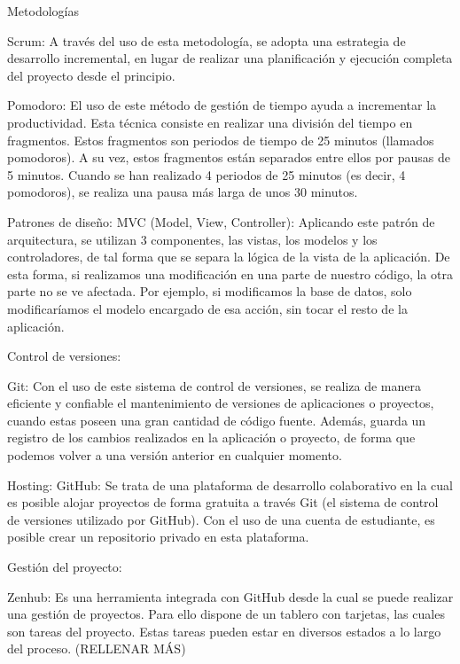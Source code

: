 
Metodologías

Scrum: A través del uso de esta metodología, se adopta una estrategia de desarrollo incremental, en lugar de realizar una planificación y ejecución completa del proyecto desde el principio.


Pomodoro: El uso de este método de gestión de tiempo ayuda a incrementar la productividad. Esta técnica consiste en realizar una división del tiempo en fragmentos. Estos fragmentos son periodos de tiempo de 25 minutos (llamados pomodoros). A su vez, estos fragmentos están separados entre ellos por pausas de 5 minutos. Cuando se han realizado 4 periodos de 25 minutos (es decir, 4 pomodoros), se realiza una pausa más larga de unos 30 minutos. 


Patrones de diseño:
MVC (Model, View, Controller): Aplicando este patrón de arquitectura, se utilizan 3 componentes, las vistas, los modelos y los controladores, de tal forma que se separa la lógica de la vista de la aplicación. De esta forma, si realizamos una modificación en una parte de nuestro código, la otra parte no se ve afectada. Por ejemplo, si modificamos la base de datos, solo modificaríamos el modelo encargado de esa acción, sin tocar el resto de la aplicación.



Control de versiones:

Git: Con el uso de este sistema de control de versiones, se realiza de manera eficiente y confiable el mantenimiento de versiones de aplicaciones o proyectos, cuando estas poseen una gran cantidad de código fuente. Además, guarda un registro de los cambios realizados en la aplicación o proyecto, de forma que podemos volver a una versión anterior en cualquier momento.


Hosting:
GitHub: Se trata de una plataforma de desarrollo colaborativo en la cual es posible alojar proyectos de forma gratuita a través Git (el sistema de control de versiones utilizado por GitHub). Con el uso de una cuenta de estudiante, es posible crear un repositorio privado en esta plataforma.


Gestión del proyecto:

Zenhub: Es una herramienta integrada con GitHub desde la cual se puede realizar una gestión de proyectos. Para ello dispone de un tablero con tarjetas, las cuales son tareas del proyecto. Estas tareas pueden estar en diversos estados a lo largo del proceso. (RELLENAR MÁS)

